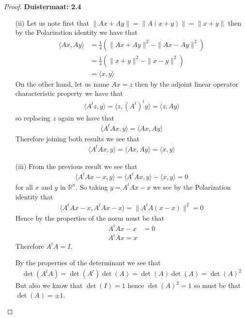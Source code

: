 \documentclass[11pt]{article}
\newcommand{\R}{\mathbb{R}}
\theoremstyle{definition}
\begin{document}
\begin{proof}{\textbf{Duistermaat: 2.4}}
\begin{itemize}
        \item [(ii)] Let us note first that
        $\|Ax + Ay\| = \|A(x + y)\| = \|x + y\|$
        then by the Polarization identity we have that
        \begin{align*}
            \langle Ax, Ay\rangle
            &= \frac{1}{4}(\|Ax + Ay\|^2 - \|Ax - Ay\|^2)\\
            &= \frac{1}{4}(\|x + y\|^2 - \|x - y\|^2)\\
            &= \langle x, y\rangle
        \end{align*}
        On the other hand, let us name $Ax = z$ then by the adjoint linear
        operator characteristic property we have that
        \begin{align*}
            \langle A^tz, y\rangle = \langle z, (A^t)^ty\rangle
            = \langle z, Ay\rangle
        \end{align*}
        so replacing $z$ again we have that
        \begin{align*}
            \langle A^tAx, y\rangle = \langle Ax, Ay\rangle
        \end{align*}
        Therefore joining both results we see that
        \begin{align*}
            \langle A^tAx, y\rangle = \langle Ax, Ay\rangle = \langle x, y\rangle
        \end{align*}
\cleardoublepage
        \item [(iii)] From the previous result we see that
        \begin{align*}
            \langle A^tAx - x, y\rangle = \langle A^tAx, y\rangle - \langle x, y\rangle = 0
        \end{align*}
        for all $x$ and $y$ in $\R^n$. So taking $y = A^tAx-x$ we see by the
        Polarization identity that
        \begin{align*}
        \langle A^tAx - x, A^tAx - x\rangle = \|A^tA(x - x)\|^2 = 0
        \end{align*}
        Hence by the properties of the norm must be that 
        \begin{align*}
            A^tAx - x &= 0\\
            A^tAx = x
        \end{align*}
        Therefore $A^tA = I$.
        
        By the properties of the determinant we see that
        \begin{align*}
            \det(A^tA) = \det(A^t)\det(A) = \det(A)\det(A) = \det(A)^2
        \end{align*}
        But also we know that $\det(I) = 1$ hence $\det(A)^2 = 1$
        so must be that $\det(A) = \pm 1$.


\end{itemize}
\end{proof}
\end{document}
